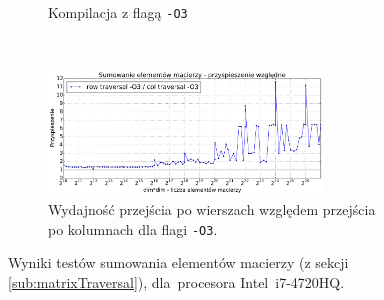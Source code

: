 \begin{figure}[!h]
\begin{subfigure}[c]{0.45\textwidth}
		\caption{Kompilacja z flagą \texttt{-O3}}
	\end{subfigure}
    \\
    \vspace{0.4cm}
    \begin{subfigure}[c]{1.0\textwidth}
        \centering
        \includegraphics[width=0.80\textwidth]{images/benchs/matrix_sum_normalized}
        \caption{Wydajność przejścia po wierszach względem przejścia po kolumnach dla flagi \texttt{-O3}.}
    \end{subfigure}
	\caption{Wyniki testów sumowania elementów macierzy (z sekcji \ref{sub:matrixTraversal}), dla~procesora \mbox{Intel i7-4720HQ}.}
	\label{fig:matrixResults}
\end{figure}

\clearpage


